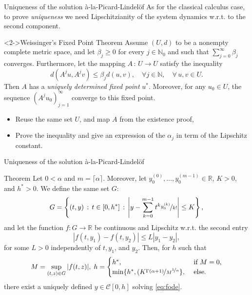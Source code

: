 \documentclass[aspectratio=169,xcolor=dvipsnames]{beamer}
\begin{document}
\begin{frame}{Uniqueness of the solution à-la-Picard-Lindel\"of}
As for the classical calculus case, to prove \emph{uniqueness} we need Lipschitzianity of the system dynamics w.r.t. to the second component.

\begin{alertblock}<2->{Weissinger’s Fixed Point Theorem}
Assume $(U,d)$ to be a nonempty complete metric space, and let $\beta_j \geq 0$ for every $j \in \mathbb{N}_0$ and such that $\sum_{j=0}^{\infty} \beta_j$ converges. Furthermore, let the mapping $A\,:\,U \rightarrow U$ satisfy the inequality
\[
d(A^j u, A^j v) \leq \beta_j d(u,v), \quad \forall j \in \mathbb{N}, \quad \forall\,u,v \in U.
\]
Then $A$ has a \emph{uniquely determined fixed point} $u^*$. Moreover, for any $u_0 \in U$, the sequence $(A^j u_0)_{j=1}^{\infty}$ converge to this fixed point.
\end{alertblock}
\begin{itemize}
	\item[\faRecycle]<3> Reuse the same set $U$, and map $A$ from the existence proof,
	\item[\faLessThanEqual]<3> Prove the inequality and give an expression of the $\alpha_j$ in term of the Lipschitz constant.
\end{itemize}

\end{frame}

\begin{frame}{Uniqueness of the solution à-la-Picard-Lindel\"of}
\begin{alertblock}{Theorem}\small
Let $0 < \alpha$ and $m = \lceil \alpha \rceil$. Moreover, let $y_0^{(0)},\ldots,y_0^{(m-1)} \in \mathbb{R}$, $K > 0$, and $h^* > 0$. We define the same set $G$:\vspace{-0.3em}
\[
G = \left\lbrace (t,y) \,:\, t \in [0,h^*] \,:\, \left| y - \sum_{k=0}^{m-1} t^k \nicefrac{y_0^{(k)}}{k!} \right| \leq K  \right\rbrace,
\]
and let the function $f : G \rightarrow \mathbb{R}$ be continuous and Lipschitz w.r.t. the second entry\vspace{-0.3em}
\[
|f(t,y_1) - f(t,y_2)| \leq L |y_1 - y_2|,
\]
for some $L > 0$ independently of $t,y_1$, and $y_2$. Then, for $h$ such that\vspace{-0.3em}
\[
M = \sup_{(t,z) \in G} |f(t,z)|, \; h = \begin{cases}
h^*, & \text{ if }M=0,\\
\min \{ h^*, (K \nicefrac{\Gamma(\alpha+1)}{M}^{\nicefrac{1}{n}} \}, & \text{ else.}
\end{cases}
\]
there exist a uniquely defined $y \in \mathcal{C}[0,h]$ solving \eqref{eq:fode}.
\end{alertblock}
\end{frame}
\end{document}

